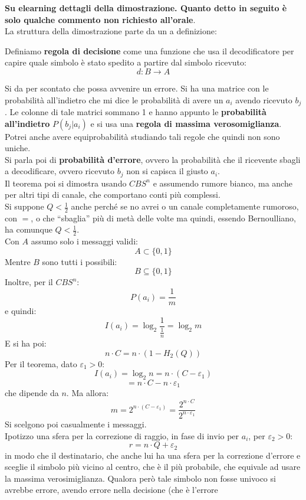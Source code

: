 \documentclass[a4paper,12pt, oneside]{book}
\begin{document}
\textbf{Su elearning dettagli della dimostrazione. Quanto detto in seguito è
  solo qualche commento non richiesto all'orale}.\\
La struttura della dimostrazione parte da un a definizione:
\begin{definizione}
  Definiamo \textbf{regola di decisione} come una funzione che usa il
  decodificatore per capire quale simbolo è stato spedito a partire dal simbolo
  ricevuto:
  \[d:B\to A\]
\end{definizione}
Si da per scontato che possa avvenire un errore. Si ha una matrice con le
probabilità all'indietro che mi dice le probabilità di avere un $a_i$ avendo
ricevuto $b_j$. Le colonne di tale matrici sommano 1 e hanno appunto le
\textbf{probabilità all'indietro} $P(b_j|a_i)$ e si usa una \textbf{regola di
  massima verosomiglianza}. Potrei anche avere equiprobabilità studiando tali
regole che quindi non sono uniche. \\
Si parla poi di \textbf{probabilità d'errore}, ovvero la probabilità che il
ricevente sbagli a decodificare, ovvero ricevuto $b_j$ non si capisca il giusto
$a_i$. \\
Il teorema poi si dimostra usando $CBS^n$ e assumendo rumore bianco, ma anche
per altri tipi di canale, che comportano conti più complessi.\\
Si suppone $Q<\frac{1}{2}$ anche perché se no avrei o un canale completamente
rumoroso, con $=$, o che ``sbaglia'' più di metà delle volte ma quindi, essendo
Bernoulliano, ha comunque $Q<\frac{1}{2}$.\\
Con $A$ assumo solo i messaggi validi:
\[A\subset\{0,1\}\]
Mentre $B$ sono tutti i possibili:
\[B\subseteq\{0,1\}\]
Inoltre, per il $CBS^n$:
\[P(a_i)=\frac{1}{m}\]
e quindi:
\[I(a_i)=\log_2\frac{1}{\frac{1}{n}}=\log_2 m\]
E si ha poi:
\[n\cdot C=n\cdot (1-H_2(Q))\]
Per il teorema, dato $\varepsilon_1>0$:
\[I(a_i)=\log_2 n=n\cdot (C-\varepsilon_1)\]
\[=n\cdot C-n\cdot \varepsilon_1\]
che dipende da $n$. Ma allora:
\[m=2^{n\cdot(C-\varepsilon_1)}=\frac{2^{n\cdot C}}{2^{n\cdot\varepsilon_1}}\]
Si scelgono poi casualmente i messaggi.\\
Ipotizzo una sfera per la correzione di raggio, in fase di invio per $a_i$,
per $\varepsilon_2>0$: 
\[r=n\cdot Q+\varepsilon_2\]
in modo che il destinatario, che anche lui ha una sfera per la correzione
d'errore e sceglie il simbolo più vicino al centro, che è il più probabile, che
equivale ad usare la massima verosimiglianza. Qualora però tale simbolo non
fosse univoco si avrebbe errore, avendo errore nella decisione (che è l'errore
\end{document}
